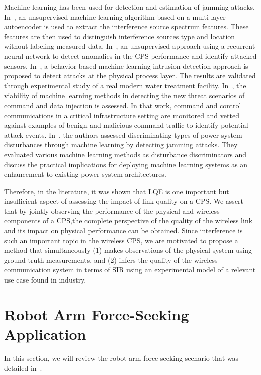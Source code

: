 Machine learning has been used for detection and estimation of jamming attacks. In~\cite{Chen2019}, an unsupervised machine learning algorithm based on a multi-layer autoencoder is used to extract the interference source spectrum features. These features are then used to distinguish interference sources type and location without labeling measured data. In~\cite{7911887},  an unsupervised approach using a recurrent neural network to detect anomalies in the CPS performance and identify attacked sensors. In~\cite{Junejo2016DataDP}, a behavior based machine learning intrusion detection approach  is proposed to detect attacks at the physical process layer. The results are validated through experimental study of a real modern water treatment facility. In~\cite{Beaver:2013:EML:2584691.2584722}, the viability of machine learning methods in detecting the new threat scenarios of command and data injection is assessed. In that work, command and control communications in a critical infrastructure setting are monitored and vetted against examples of benign and malicious command traffic to identify potential attack events. In~\cite{6900095}, the authors assessed discriminating types of power system disturbances through machine learning by detecting jamming attacks. They evaluated various machine learning methods as disturbance discriminators and discuss the practical implications for deploying machine learning systems as an enhancement to existing power system architectures.

Therefore, in the literature, it was shown that LQE is one important but insufficient aspect of assessing the impact of link quality on a CPS. We assert that by jointly observing the performance of the physical and wireless components of a CPS,the complete perspective of the quality of the wireless link and its impact on physical performance can be obtained. Since interference is such an important topic in the wireless CPS, we are motivated to propose a method that simultaneously (1) makes observations of the physical system using ground truth measurements, and (2) infers the quality of the wireless communication system in terms of SIR using an experimental model of a relevant use case found in industry.
    
\section{Robot Arm Force-Seeking Application}\label{ftml:sec:ftseekerapp}
In this section, we will review the robot arm force-seeking scenario that was detailed in~\cite{Candell_ISIT_2019}.

